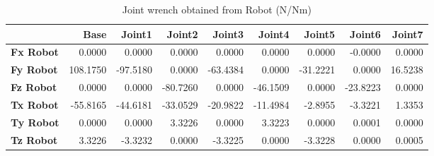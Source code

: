 \begin{table}[h!]
	\centering
	\caption{Joint wrench obtained from Robot (N/Nm)}
	\label{wrech_Robot_Pose13}
	\begin{tabular}{|l|r|r|r|r|r|r|r|r|}
		\hline
		\textbf{} & \textbf{Base} & \textbf{Joint1}  & \textbf{Joint2}  & \textbf{Joint3}  & \textbf{Joint4}  & \textbf{Joint5}  & \textbf{Joint6}  & \textbf{Joint7} \\ \hline
		\textbf{Fx Robot}  & 0.0000        & 0.0000        & 0.0000        & 0.0000        & 0.0000        & 0.0000        & -0.0000        & 0.0000 \\ \hline
		\textbf{Fy Robot}  & 108.1750        & -97.5180        & 0.0000        & -63.4384        & 0.0000        & -31.2221        & 0.0000        & 16.5238 \\ \hline
		\textbf{Fz Robot}  & 0.0000        & 0.0000        & -80.7260        & 0.0000        & -46.1509        & 0.0000        & -23.8223        & 0.0000 \\ \hline
		\textbf{Tx Robot}  & -55.8165        & -44.6181        & -33.0529        & -20.9822        & -11.4984        & -2.8955        & -3.3221        & 1.3353 \\ \hline
		\textbf{Ty Robot}  & 0.0000        & 0.0000        & 3.3226        & 0.0000        & 3.3223        & 0.0000        & 0.0001        & 0.0000 \\ \hline
		\textbf{Tz Robot}  & 3.3226        & -3.3232        & 0.0000        & -3.3225        & 0.0000        & -3.3228        & 0.0000        & 0.0005 \\ \hline
	\end{tabular}
\end{table}

